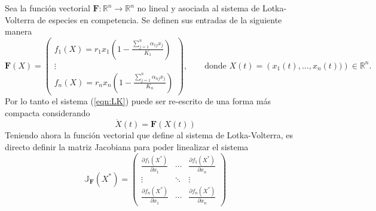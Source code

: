\newpage
\begin{definición}\label{def:LKVectorial}
	Sea la función vectorial $\mathbf{F}:\mathbb{R}^n\to\mathbb{R}^n$ no lineal y asociada al sistema de Lotka-Volterra de especies en competencia. Se definen sus entradas de la siguiente manera
	\begin{equation}\label{eqn:Fmatricial}
		\mathbf{F}(X)=\begin{pmatrix}
			f_1(X)=r_1x_1\left(1-\frac{\sum_{j=1}^n \alpha_{1j}x_j}{K_1}\right)\\
			\vdots\\
			f_n(X)=r_nx_n\left(1-\frac{\sum_{j=1}^n \alpha_{nj}x_j}{K_n}\right)
		\end{pmatrix},\qquad\text{donde $X(t)=\left(x_1(t),...,x_n(t))\right)\in\mathbb{R}^n$.}
	\end{equation}
	Por lo tanto el sistema (\ref{eqn:LK}) puede ser re-escrito de una forma más compacta considerando
	\begin{equation}\label{eqn:LKmatricial}
		\dot{X}(t) = \mathbf{F}(X(t))
	\end{equation}
	Teniendo ahora la función vectorial que define al sistema de Lotka-Volterra, es directo definir la matriz Jacobiana para poder linealizar el sistema
	\begin{equation}\label{eqn:Jacobiano}
		\mathbb{J}_\mathbf{F}(X^*) = \begin{pmatrix}
			\frac{\partial f_1(X^*)}{\partial x_1} & \cdots &\frac{\partial f_1(X^*)}{\partial x_n}\\
			\vdots & \ddots & \vdots\\
			\frac{\partial f_n(X^*)}{\partial x_1} & \cdots &\frac{\partial f_n(X^*)}{\partial x_n}
		\end{pmatrix}
	\end{equation}
\end{definición}


